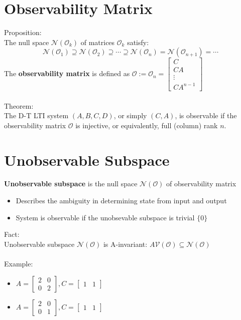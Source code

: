 \documentclass[10pt,a4paper,oneside]{article}
\begin{document}
\section{Observability Matrix}
Proposition:\\
The null space $\mathcal{N}\left(\mathcal{O}_{k}\right)$ of matrices $\mathcal{O}_{k}$ satisfy:
\[
\mathcal{N}\left(\mathcal{O}_{1}\right) \supseteq \mathcal{N}\left(\mathcal{O}_{2}\right) \supseteq \cdots \supseteq \mathcal{N}\left(\mathcal{O}_{n}\right)=\mathcal{N}\left(\mathcal{O}_{n+1}\right)=\cdots
\]
The {\bfseries observability matrix} is defined as $\mathcal{O} :=\mathcal{O}_{n}=\left[\begin{array}{c}{C} \\ {C A} \\ {\vdots} \\ {C A^{n-1}}\end{array}\right]$\\
\\Theorem:\\
The D-T LTI system $(A,B,C,D)$, or simply $(C,A)$, is observable if the observability matrix $\mathcal{O}$ is injective, or equivalently, full (column) rank $n$.
\section{Unobservable Subspace}
{\bfseries Unobservable subspace} is the null space $\mathcal{N(O)}$ of observability matrix
\begin{itemize}
\item Describes the ambiguity in determining state from input and output
\item System is observable if the unobsevable subspace is trivial $\{0\}$
\end{itemize}
Fact:\\
Unobservable subspace {\bfseries $\mathcal{N(O)}$} is A-invariant: $A \mathcal{V}(\mathcal{O}) \subseteq \mathcal{N}(\mathcal{O})$\\
\\Example:
\begin{itemize}
\item $
A=\left[\begin{array}{ll}{2} & {0} \\ {0} & {2}\end{array}\right], C=\left[\begin{array}{ll}{1} & {1}\end{array}\right]
$
\item $
A=\left[\begin{array}{ll}{2} & {0} \\ {0} & {1}\end{array}\right], C=\left[\begin{array}{ll}{1} & {1}\end{array}\right]
$
\end{itemize}
\end{document}
